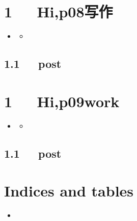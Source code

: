 \documentclass[letterpaper,10pt,english]{sphinxmanual}
\begin{document}
\chapter{1   Hi,p08写作}
\label{\detokenize{p08_u5199_u4f5c/Hello_uff0cp08_u5199_u4f5c:hi-p08}}\label{\detokenize{p08_u5199_u4f5c/Hello_uff0cp08_u5199_u4f5c::doc}}
\begin{sphinxShadowBox}
\begin{itemize}
\item {} 
\label{\detokenize{p08_u5199_u4f5c/Hello_uff0cp08_u5199_u4f5c:id2}}{\hyperref[\detokenize{p08_u5199_u4f5c/Hello_uff0cp08_u5199_u4f5c:hi-p08}]{}}
\begin{itemize}
\item {} 
\label{\detokenize{p08_u5199_u4f5c/Hello_uff0cp08_u5199_u4f5c:id3}}{\hyperref[\detokenize{p08_u5199_u4f5c/Hello_uff0cp08_u5199_u4f5c:post}]{}}

\end{itemize}

\end{itemize}
\end{sphinxShadowBox}


\section{1.1   post}
\label{\detokenize{p08_u5199_u4f5c/Hello_uff0cp08_u5199_u4f5c:post}}

\chapter{1   Hi,p09work}
\label{\detokenize{p09work/Hello_uff0cp09work:hi-p09work}}\label{\detokenize{p09work/Hello_uff0cp09work::doc}}
\begin{sphinxShadowBox}
\begin{itemize}
\item {} 
\label{\detokenize{p09work/Hello_uff0cp09work:id2}}{\hyperref[\detokenize{p09work/Hello_uff0cp09work:hi-p09work}]{}}
\begin{itemize}
\item {} 
\label{\detokenize{p09work/Hello_uff0cp09work:id3}}{\hyperref[\detokenize{p09work/Hello_uff0cp09work:post}]{}}

\end{itemize}

\end{itemize}
\end{sphinxShadowBox}


\section{1.1   post}
\label{\detokenize{p09work/Hello_uff0cp09work:post}}

\chapter{Indices and tables}
\label{\detokenize{index:indices-and-tables}}\begin{itemize}
\item {} 

\end{itemize}



\renewcommand{\indexname}{索引}
\printindex
\end{document}
